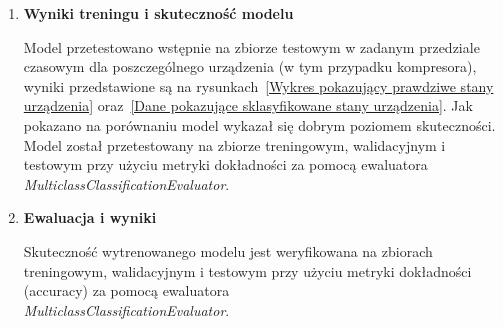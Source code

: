 \begin{enumerate}
    \item \textbf{Wyniki treningu i skuteczność modelu}

Model przetestowano wstępnie na zbiorze testowym w zadanym przedziale czasowym dla poszczególnego urządzenia (w tym przypadku kompresora), wyniki przedstawione są na rysunkach~\ref{Wykres pokazujący prawdziwe stany urządzenia} oraz~\ref{Dane pokazujące sklasyfikowane stany urządzenia}. Jak pokazano na porównaniu model wykazał się dobrym poziomem skuteczności. Model został przetestowany na zbiorze treningowym, walidacyjnym i testowym przy użyciu metryki dokładności za pomocą ewaluatora \textit{MulticlassClassificationEvaluator}. 


\label{fig:prawdziwe_stany}

\label{fig:sklasyfikowane_stany}

    \item \textbf{Ewaluacja i wyniki}

Skuteczność wytrenowanego modelu jest weryfikowana na zbiorach treningowym, walidacyjnym i testowym przy użyciu metryki dokładności (accuracy) za pomocą ewaluatora \\ \textit{MulticlassClassificationEvaluator}.


\end{enumerate}
